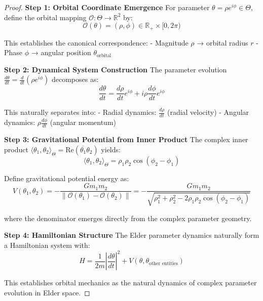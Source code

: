 \begin{proof}
\textbf{Step 1: Orbital Coordinate Emergence}
For parameter $\theta = \rho e^{i\phi} \in \Theta$, define the orbital mapping $\mathcal{O}: \Theta \rightarrow \mathbb{R}^2$ by:
$$\mathcal{O}(\theta) = (\rho, \phi) \in \mathbb{R}_+ \times [0,2\pi)$$

This establishes the canonical correspondence:
- Magnitude $\rho$ → orbital radius $r$
- Phase $\phi$ → angular position $\theta_{\text{orbital}}$

\textbf{Step 2: Dynamical System Construction}
The parameter evolution $\frac{d\theta}{dt} = \frac{d}{dt}(\rho e^{i\phi})$ decomposes as:
$$\frac{d\theta}{dt} = \frac{d\rho}{dt} e^{i\phi} + i\rho \frac{d\phi}{dt} e^{i\phi}$$

This naturally separates into:
- Radial dynamics: $\frac{d\rho}{dt}$ (radial velocity)
- Angular dynamics: $\rho \frac{d\phi}{dt}$ (angular momentum)

\textbf{Step 3: Gravitational Potential from Inner Product}
The complex inner product $\langle \theta_1, \theta_2 \rangle_\Theta = \text{Re}(\overline{\theta_1} \theta_2)$ yields:
$$\langle \theta_1, \theta_2 \rangle_\Theta = \rho_1 \rho_2 \cos(\phi_2 - \phi_1)$$

Define gravitational potential energy as:
$$V(\theta_1, \theta_2) = -\frac{G m_1 m_2}{\|\mathcal{O}(\theta_1) - \mathcal{O}(\theta_2)\|} = -\frac{G m_1 m_2}{\sqrt{\rho_1^2 + \rho_2^2 - 2\rho_1\rho_2\cos(\phi_2-\phi_1)}}$$

where the denominator emerges directly from the complex parameter geometry.

\textbf{Step 4: Hamiltonian Structure}
The Elder parameter dynamics naturally form a Hamiltonian system with:
$$H = \frac{1}{2m}\left|\frac{d\theta}{dt}\right|^2 + V(\theta, \theta_{\text{other entities}})$$

This establishes orbital mechanics as the natural dynamics of complex parameter evolution in Elder space.
\end{proof}

